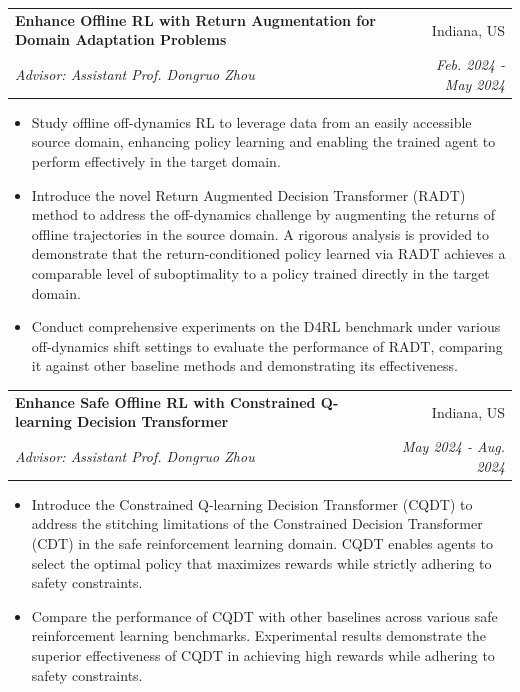 \documentclass[letterpaper,10.8pt]{article}
\makeatletter
\newcommand{\resumeSubheading}[4]{
  \vspace{-1pt}\item
    \begin{tabular*}{0.97\textwidth}{l@{\extracolsep{\fill}}r}
      \textbf{#1} & #2 \\
      \textit{\small#3} & \textit{\small #4} \\
    \end{tabular*}\vspace{-5pt}
}
\makeatother
\begin{document}
\resumeSubheading
{Enhance Offline RL with Return Augmentation for Domain Adaptation Problems}{Indiana, US}
{Advisor: Assistant Prof. Dongruo Zhou}{Feb. 2024 - May 2024}
\begin{itemize}[label=$\circ$,leftmargin=0.15in]
\setlength\itemsep{-0.1em}
\item Study offline off-dynamics RL to leverage data from an easily accessible source domain, enhancing policy learning and enabling the trained agent to perform effectively in the target domain.
\item Introduce the novel Return Augmented Decision Transformer (RADT) method to address the off-dynamics challenge by augmenting the returns of offline trajectories in the source domain. A rigorous analysis is provided to demonstrate that the return-conditioned policy learned via RADT achieves a comparable level of suboptimality to a policy trained directly in the target domain.
\item Conduct comprehensive experiments on the D4RL benchmark under various off-dynamics shift settings to evaluate the performance of RADT, comparing it against other baseline methods and demonstrating its effectiveness.
\end{itemize}


\resumeSubheading
{Enhance Safe Offline RL with Constrained Q-learning Decision Transformer}{Indiana, US}
{Advisor: Assistant Prof. Dongruo Zhou}{May 2024 - Aug. 2024}
\begin{itemize}[label=$\circ$,leftmargin=0.15in]
\setlength\itemsep{-0.1em}
\item Introduce the Constrained Q-learning Decision Transformer (CQDT) to address the stitching limitations of the Constrained Decision Transformer (CDT) in the safe reinforcement learning domain. CQDT enables agents to select the optimal policy that maximizes rewards while strictly adhering to safety constraints.
\item Compare the performance of CQDT with other baselines across various safe reinforcement learning benchmarks. Experimental results demonstrate the superior effectiveness of CQDT in achieving high rewards while adhering to safety constraints.
\end{itemize}
\end{document}
